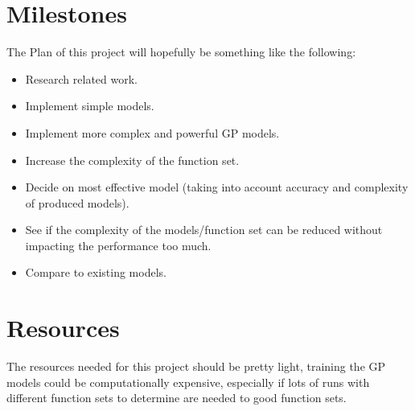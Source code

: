 \documentclass[7.5pt,twocolumn]{article}
\begin{document}
	\section{Milestones}
	The Plan of this project will hopefully be something like the following:
	\begin{itemize}
		\item Research related work.
		\item Implement simple models.
		\item Implement more complex and powerful GP models.
		\item Increase the complexity of the function set.
		\item Decide on most effective model (taking into account accuracy and complexity of produced models).
		\item See if the complexity of the models/function set can be reduced without impacting the performance too much.
		\item Compare to existing models.
	\end{itemize}
	\section{Resources}
	The resources needed for this project should be pretty light, training the GP models could be computationally expensive, especially if lots of runs with different function sets to determine are needed to good function sets.
	\printbibliography{}
\end{document}
